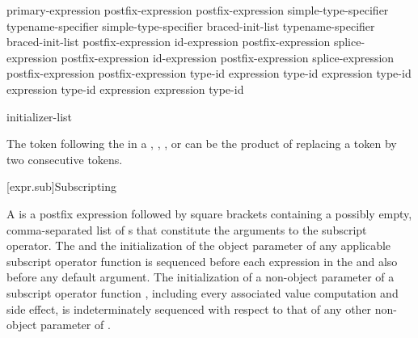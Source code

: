 \begin{bnf}
\br
    primary-expression\br
    postfix-expression \terminal{[}  \terminal{]}\br
    postfix-expression \terminal{(}  \terminal{)}\br
    simple-type-specifier \terminal{(}  \terminal{)}\br
    typename-specifier \terminal{(}  \terminal{)}\br
    simple-type-specifier braced-init-list\br
    typename-specifier braced-init-list\br
    postfix-expression   id-expression\br
    postfix-expression  splice-expression\br
    postfix-expression \terminal{->}  id-expression\br
    postfix-expression \terminal{->} splice-expression\br
    postfix-expression \terminal{++}\br
    postfix-expression \terminal{--}\br
     \terminal{<} type-id \terminal{>} \terminal{(} expression \terminal{)}\br
     \terminal{<} type-id \terminal{>} \terminal{(} expression \terminal{)}\br
     \terminal{<} type-id \terminal{>} \terminal{(} expression \terminal{)}\br
     \terminal{<} type-id \terminal{>} \terminal{(} expression \terminal{)}\br
     \terminal{(} expression \terminal{)}\br
     \terminal{(} type-id \terminal{)}
\end{bnf}

\begin{bnf}
\br
    initializer-list
\end{bnf}

\pnum
\begin{note}
The \tcode{>} token following the
 in a ,
, , or
 can be the product of replacing a
\tcode{>>} token by two consecutive \tcode{>}
tokens.
\end{note}

[expr.sub]{Subscripting}

\pnum
{}%
%
A  is a postfix expression
followed by square brackets containing
a possibly empty, comma-separated list of s
that constitute the arguments to the subscript operator.
The  and
the initialization of the object parameter of
any applicable subscript operator function is sequenced before
each expression in the  and also before
any default argument.
The initialization of a non-object parameter of
a subscript operator function ,
including every associated value computation and side effect,
is indeterminately sequenced with respect to that of
any other non-object parameter of .


